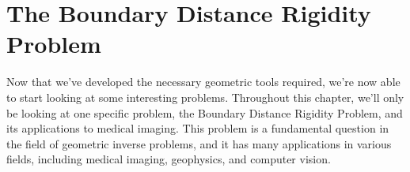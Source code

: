 \chapter{The Boundary Distance Rigidity Problem}
\label{chap:2}

Now that we've developed the necessary geometric tools required, we're now able to start looking at some interesting problems. Throughout this chapter, we'll only be looking at one specific problem, the Boundary Distance Rigidity Problem, and its applications to medical imaging. This problem is a fundamental question in the field of geometric inverse problems, and it has many applications in various fields, including medical imaging, geophysics, and computer vision.






